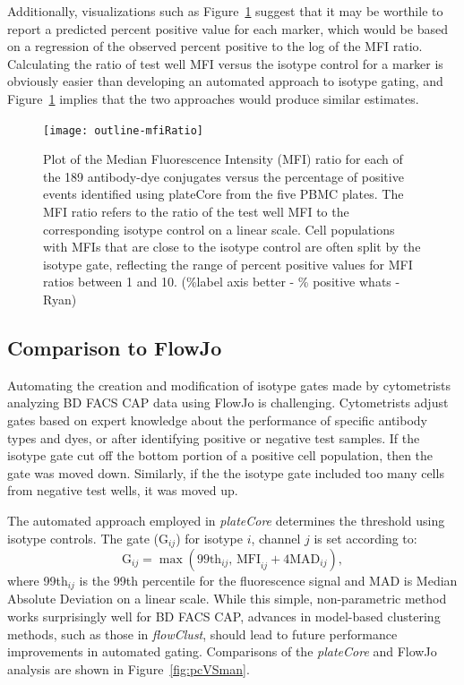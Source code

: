 \documentclass[12pt]{article}
\newcommand{\Rpackage}[1]{{\textit{#1}}}
\begin{document}
Additionally, visualizations such as Figure~\ref{fig:mfiRatio} suggest that it
may be worthile to report a predicted percent positive value for each marker,
which would be based on a regression of the observed percent positive to the
log of the MFI ratio. Calculating the ratio of test well MFI versus the isotype
control for a marker is obviously easier than developing an automated approach
to isotype gating, and Figure~\ref{fig:mfiRatio} implies that the two
approaches would produce similar estimates.

\begin{figure}
\centering
\texttt{[image: outline-mfiRatio]}
\caption{Plot of the Median Fluorescence Intensity (MFI) ratio for each of the
189 antibody-dye conjugates versus the percentage of positive events identified
using plateCore from the five PBMC plates. The MFI ratio refers to the ratio of
the test well MFI to the corresponding isotype control on a linear scale. Cell
populations with MFIs that are close to the isotype control are often split by
the isotype gate, reflecting the range of percent positive values for MFI
ratios between 1 and 10. (\%label axis better - \% positive whats - Ryan)}
\label{fig:mfiRatio}
\end{figure}

\subsection*{Comparison to FlowJo}

Automating the creation and modification of isotype gates made by cytometrists
analyzing BD FACS CAP data using FlowJo is challenging. Cytometrists adjust
gates based on expert knowledge about the performance of specific antibody
types and dyes, or after identifying positive or negative test samples. If the
isotype gate cut off the bottom portion of a positive cell population, then
the gate was moved down.  Similarly, if the the isotype gate included too many
cells from negative test wells, it was moved up.

The automated approach employed in \Rpackage{plateCore} determines the
threshold using isotype controls. The gate (G$_{ij}$) for isotype $i$, channel
$j$ is set according to:
\begin{equation}
\text{G}_{ij} = \max (\text{99th}_{ij} \text{, MFI}_{ij}+ 4 \text{MAD}_{ij}),
\label{isoGate}
\end{equation}
where 99th$_{ij}$ is the 99th percentile for the fluorescence signal and MAD is
Median Absolute Deviation on a linear scale. While this simple, non-parametric
method works surprisingly well for BD FACS CAP, advances in model-based
clustering methods, such as those in \Rpackage{flowClust}, should lead to
future performance improvements in automated gating. Comparisons of the
\Rpackage{plateCore} and FlowJo analysis are shown in Figure~\ref{fig:pcVSman}.
\end{document}
